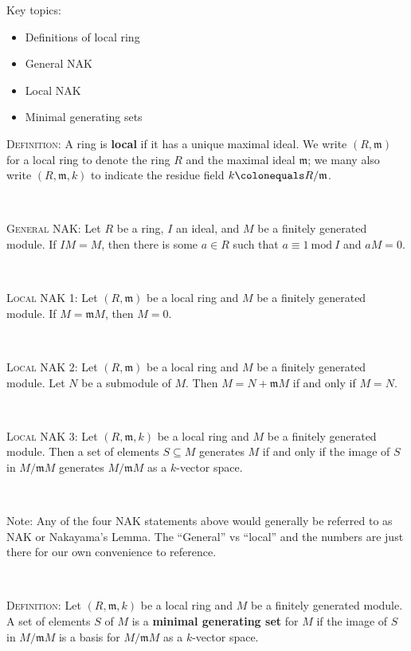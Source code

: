 \documentclass[12pt]{amsart}
\newcommand{\m}{\mathfrak{m}}
\newcommand{\0}{$\phantom{.}$}
\newcommand{\1}{\mathbbm{1}}
\newcommand\ceq{\colonequals}
\begin{document}
\begin{framed} Key topics:
\begin{itemize}
\item Definitions of local ring
\item General NAK
\item Local NAK
\item Minimal generating sets
\end{itemize}
\end{framed}



\noindent \textsc{Definition:} A ring is \textbf{local} if it has a unique maximal ideal. We write $(R,\m)$ for a local ring to denote the ring $R$ and the maximal ideal $\m$; we many also write $(R,\m,k)$ to indicate the residue field $k\ceq R/\m$.


\

\noindent \textsc{General NAK:} Let $R$ be a ring, $I$ an ideal, and $M$ be a finitely generated module. If $IM=M$, then there is some $a\in R$ such that $a\equiv 1 \ \mathrm{mod} \ I$ and  $aM=0$.

\

\noindent \textsc{Local NAK 1:} Let $(R,\m)$ be a local ring and $M$ be a finitely generated module. If $M=\m M$, then $M=0$.

\

\noindent \textsc{Local NAK 2:} Let $(R,\m)$ be a local ring and $M$ be a finitely generated module. Let $N$ be a submodule of $M$. Then $M = N + \m M$ if and only if $M=N$.

\

\noindent \textsc{Local NAK 3:} Let $(R,\m,k)$ be a local ring and $M$ be a finitely generated module. Then a set of elements $S\subseteq M$ generates $M$ if and only if the image of $S$ in $M/\m M$ generates $M/\m M$ as a $k$-vector space.


\

Note: Any of the four NAK statements above would generally be referred to as NAK or Nakayama's Lemma. The ``General'' vs ``local'' and the numbers are just there for our own convenience to reference.

\

\noindent \textsc{Definition:} Let $(R,\m,k)$ be a local ring and $M$ be a finitely generated module. A set of elements $S$ of $M$ is a \textbf{minimal generating set} for $M$ if the image of $S$ in $M/\m M$ is a basis for $M/\m M$ as a $k$-vector space.
\end{document}

